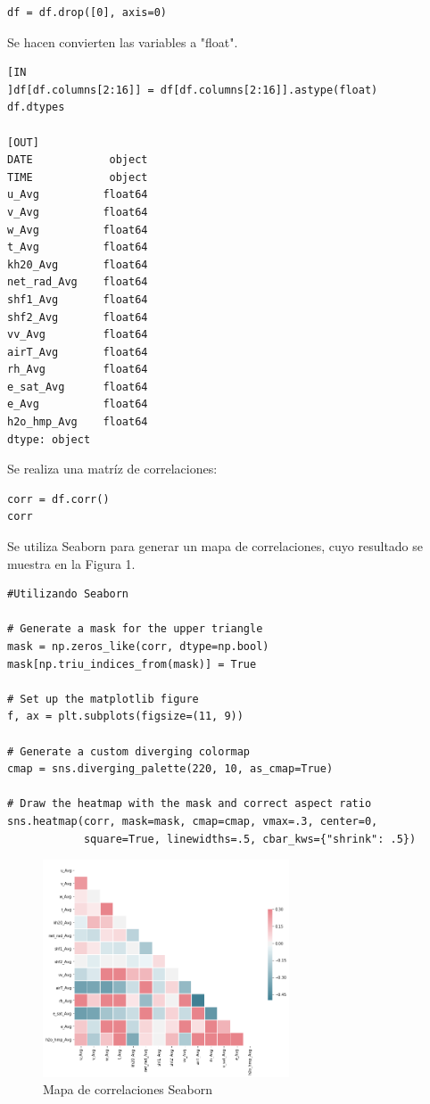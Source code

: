 \documentclass[11pt, spanish]{report}
\begin{document}
\begin{verbatim}
df = df.drop([0], axis=0)
\end{verbatim}
Se hacen convierten las variables a "float".
\begin{verbatim}
[IN
]df[df.columns[2:16]] = df[df.columns[2:16]].astype(float)
df.dtypes

[OUT]
DATE            object
TIME            object
u_Avg          float64
v_Avg          float64
w_Avg          float64
t_Avg          float64
kh20_Avg       float64
net_rad_Avg    float64
shf1_Avg       float64
shf2_Avg       float64
vv_Avg         float64
airT_Avg       float64
rh_Avg         float64
e_sat_Avg      float64
e_Avg          float64
h2o_hmp_Avg    float64
dtype: object
\end{verbatim}
Se realiza una matríz de correlaciones:
\begin{verbatim}
corr = df.corr()
corr
\end{verbatim}
Se utiliza Seaborn para generar un mapa de correlaciones, cuyo resultado se muestra en la Figura 1.
\begin{verbatim}
#Utilizando Seaborn

# Generate a mask for the upper triangle
mask = np.zeros_like(corr, dtype=np.bool)
mask[np.triu_indices_from(mask)] = True

# Set up the matplotlib figure
f, ax = plt.subplots(figsize=(11, 9))

# Generate a custom diverging colormap
cmap = sns.diverging_palette(220, 10, as_cmap=True)

# Draw the heatmap with the mask and correct aspect ratio
sns.heatmap(corr, mask=mask, cmap=cmap, vmax=.3, center=0,
            square=True, linewidths=.5, cbar_kws={"shrink": .5})
\end{verbatim}
\begin{figure}[ht]
\caption{Mapa de correlaciones Seaborn}
\centering
\includegraphics[width=0.65\textwidth]{Seaborn.png}
\end{figure}
\end{document}
